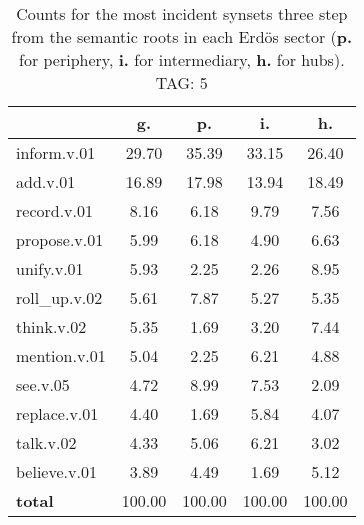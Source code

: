 \begin{table}[h!]
\begin{center}
\begin{tabular}{| l || c | c | c | c |}\hline
 & {\bf g.} & {\bf p.} & {\bf i.} & {\bf h.} \\\hline\hline
inform.v.01 & 29.70  & 35.39  & 33.15  & 26.40 \\\hline
add.v.01 & 16.89  & 17.98  & 13.94  & 18.49 \\\hline
record.v.01 & 8.16  & 6.18  & 9.79  & 7.56 \\\hline
propose.v.01 & 5.99  & 6.18  & 4.90  & 6.63 \\\hline
unify.v.01 & 5.93  & 2.25  & 2.26  & 8.95 \\\hline
roll\_up.v.02 & 5.61  & 7.87  & 5.27  & 5.35 \\\hline
think.v.02 & 5.35  & 1.69  & 3.20  & 7.44 \\\hline
mention.v.01 & 5.04  & 2.25  & 6.21  & 4.88 \\\hline
see.v.05 & 4.72  & 8.99  & 7.53  & 2.09 \\\hline
replace.v.01 & 4.40  & 1.69  & 5.84  & 4.07 \\\hline
talk.v.02 & 4.33  & 5.06  & 6.21  & 3.02 \\\hline
believe.v.01 & 3.89  & 4.49  & 1.69  & 5.12 \\\hline\hline
{{\bf total}} & 100.00  & 100.00  & 100.00  & 100.00 \\\hline
\end{tabular}
\caption{Counts for the most incident synsets three step from the semantic roots in each Erd\"os sector ({\bf p.} for periphery, {\bf i.} for intermediary, {\bf h.} for hubs). TAG: 5}
\end{center}
\end{table}